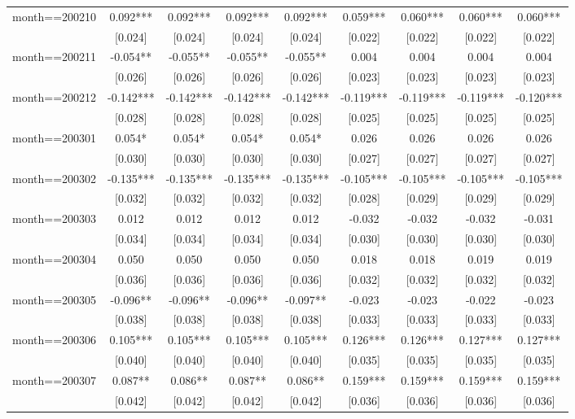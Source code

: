\documentclass[]{article}
\begin{document}
\begin{tabular}{lcccccccc}
month==200210 & 0.092*** & 0.092*** & 0.092*** & 0.092*** & 0.059*** & 0.060*** & 0.060*** & 0.060*** \\
 & [0.024] & [0.024] & [0.024] & [0.024] & [0.022] & [0.022] & [0.022] & [0.022] \\
month==200211 & -0.054** & -0.055** & -0.055** & -0.055** & 0.004 & 0.004 & 0.004 & 0.004 \\
 & [0.026] & [0.026] & [0.026] & [0.026] & [0.023] & [0.023] & [0.023] & [0.023] \\
month==200212 & -0.142*** & -0.142*** & -0.142*** & -0.142*** & -0.119*** & -0.119*** & -0.119*** & -0.120*** \\
 & [0.028] & [0.028] & [0.028] & [0.028] & [0.025] & [0.025] & [0.025] & [0.025] \\
month==200301 & 0.054* & 0.054* & 0.054* & 0.054* & 0.026 & 0.026 & 0.026 & 0.026 \\
 & [0.030] & [0.030] & [0.030] & [0.030] & [0.027] & [0.027] & [0.027] & [0.027] \\
month==200302 & -0.135*** & -0.135*** & -0.135*** & -0.135*** & -0.105*** & -0.105*** & -0.105*** & -0.105*** \\
 & [0.032] & [0.032] & [0.032] & [0.032] & [0.028] & [0.029] & [0.029] & [0.029] \\
month==200303 & 0.012 & 0.012 & 0.012 & 0.012 & -0.032 & -0.032 & -0.032 & -0.031 \\
 & [0.034] & [0.034] & [0.034] & [0.034] & [0.030] & [0.030] & [0.030] & [0.030] \\
month==200304 & 0.050 & 0.050 & 0.050 & 0.050 & 0.018 & 0.018 & 0.019 & 0.019 \\
 & [0.036] & [0.036] & [0.036] & [0.036] & [0.032] & [0.032] & [0.032] & [0.032] \\
month==200305 & -0.096** & -0.096** & -0.096** & -0.097** & -0.023 & -0.023 & -0.022 & -0.023 \\
 & [0.038] & [0.038] & [0.038] & [0.038] & [0.033] & [0.033] & [0.033] & [0.033] \\
month==200306 & 0.105*** & 0.105*** & 0.105*** & 0.105*** & 0.126*** & 0.126*** & 0.127*** & 0.127*** \\
 & [0.040] & [0.040] & [0.040] & [0.040] & [0.035] & [0.035] & [0.035] & [0.035] \\
month==200307 & 0.087** & 0.086** & 0.087** & 0.086** & 0.159*** & 0.159*** & 0.159*** & 0.159*** \\
 & [0.042] & [0.042] & [0.042] & [0.042] & [0.036] & [0.036] & [0.036] & [0.036] \\

\end{tabular}
\end{document}
